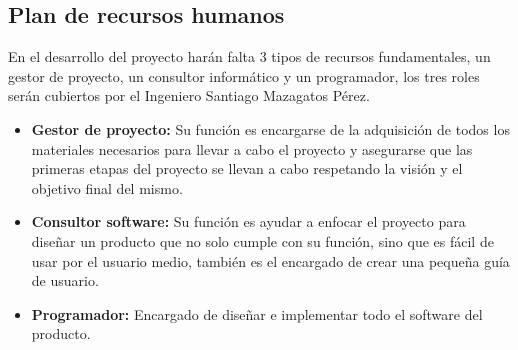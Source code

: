 \subsection{Plan de recursos humanos}\label{sec:planRecursosHumanos}

En el desarrollo del proyecto harán falta 3 tipos de recursos fundamentales, un gestor de proyecto, un consultor informático y un programador, los tres roles serán cubiertos por el Ingeniero Santiago Mazagatos Pérez.

\begin{itemize}
	\item \textbf{Gestor de proyecto:} 
	Su función es encargarse de la adquisición de todos los materiales necesarios para llevar a cabo el proyecto y asegurarse que las primeras etapas del proyecto se llevan a cabo respetando la visión y el objetivo final del mismo.
	\item \textbf{Consultor software:} 
	Su función es ayudar a enfocar el proyecto para diseñar un producto que no solo cumple con su función, sino que es fácil de usar por el usuario medio, también es el encargado de crear una pequeña guía de usuario.
	\item \textbf{Programador:} 
	Encargado de diseñar e implementar todo el software del producto.
\end{itemize}